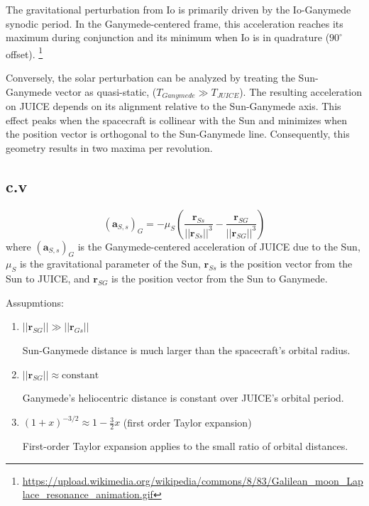 \documentclass{report}
\begin{document}
The gravitational perturbation from Io is primarily driven by the Io-Ganymede synodic period. In the Ganymede-centered frame, this acceleration reaches its maximum during conjunction and its minimum when Io is in quadrature ($90^\circ$ offset).
\footnote{\url{https://upload.wikimedia.org/wikipedia/commons/8/83/Galilean_moon_Laplace_resonance_animation.gif}} 

Conversely, the solar perturbation can be analyzed by treating the Sun-Ganymede vector as quasi-static, ($T_{Ganymede} \gg T_{JUICE}$). The resulting acceleration on JUICE depends on its alignment relative to the Sun-Ganymede axis.  This effect peaks when the spacecraft is collinear with the Sun and minimizes when the position vector is orthogonal to the Sun-Ganymede line. Consequently, this geometry results in two maxima per revolution.

\subsection*{c.v}

\begin{equation*}
    \left(\mathbf{a}_{S,s}\right)_{G} = -\mu_{S} \left( \frac{\mathbf{r}_{Ss}}{||\mathbf{r}_{Ss}||^3} - \frac{\mathbf{r}_{SG}}{||\mathbf{r}_{SG}||^3} \right)
\end{equation*}
where $\left(\mathbf{a}_{S,s}\right)_{G}$ is the Ganymede-centered acceleration of JUICE due to the Sun, $\mu_{S}$ is the gravitational parameter of the Sun, $\mathbf{r}_{Ss}$ is the position vector from the Sun to JUICE, and $\mathbf{r}_{SG}$ is the position vector from the Sun to Ganymede.

Assupmtions:
\begin{enumerate}
    \item $||\mathbf{r}_{SG}|| \gg ||\mathbf{r}_{Gs}||$ 
    
    {Sun-Ganymede distance is much larger than the spacecraft's orbital radius.}\\
    \item $||\mathbf{r}_{SG}|| \approx \text{constant}$ 
    
    {Ganymede’s heliocentric distance is constant over JUICE’s orbital period.}\\
    \item $(1+x)^{-3/2} \approx 1 - \frac{3}{2}x$ (first order Taylor expansion)
    
    {First-order Taylor expansion applies to the small ratio of orbital distances.}\\
\end{enumerate}
\end{document}
